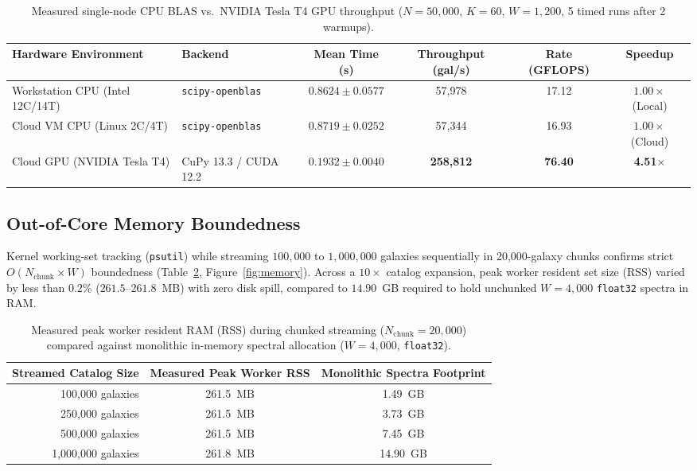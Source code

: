 \documentclass[preprint,12pt,authoryear]{elsarticle}
\begin{document}
\begin{table}[t]
\centering
\caption{Measured single-node CPU BLAS vs.\ NVIDIA Tesla T4 GPU throughput ($N=50{,}000$, $K=60$, $W=1{,}200$, 5 timed runs after 2 warmups).}
\label{tab:throughput}
\small
\begin{tabular}{@{}llcccc@{}}
\toprule
\textbf{Hardware Environment} & \textbf{Backend} & \textbf{Mean Time (s)} & \textbf{Throughput (gal/s)} & \textbf{Rate (GFLOPS)} & \textbf{Speedup} \\
\midrule
Workstation CPU (Intel 12C/14T) & \texttt{scipy-openblas} & $0.8624 \pm 0.0577$ & 57,978 & 17.12 & $1.00\times$ (Local) \\
Cloud VM CPU (Linux 2C/4T) & \texttt{scipy-openblas} & $0.8719 \pm 0.0252$ & 57,344 & 16.93 & $1.00\times$ (Cloud) \\
Cloud GPU (NVIDIA Tesla T4) & CuPy 13.3 / CUDA 12.2 & $0.1932 \pm 0.0040$ & \textbf{258,812} & \textbf{76.40} & \textbf{4.51$\times$} \\
\bottomrule
\end{tabular}
\end{table}

\subsection{Out-of-Core Memory Boundedness}
\label{sec:memory}
Kernel working-set tracking (\texttt{psutil}) while streaming $100{,}000$ to $1{,}000{,}000$ galaxies sequentially in 20,000-galaxy chunks confirms strict $O(N_{\text{chunk}} \times W)$ boundedness (Table~\ref{tab:memory}, Figure~\ref{fig:memory}). Across a $10\times$ catalog expansion, peak worker resident set size (RSS) varied by less than $0.2\%$ ($261.5$--$261.8$~MB) with zero disk spill, compared to $14.90$~GB required to hold unchunked $W=4{,}000$ \texttt{float32} spectra in RAM.

\begin{table}[t]
\centering
\caption{Measured peak worker resident RAM (RSS) during chunked streaming ($N_{\text{chunk}} = 20{,}000$) compared against monolithic in-memory spectral allocation ($W=4{,}000$, \texttt{float32}).}
\label{tab:memory}
\small
\begin{tabular}{@{}rcc@{}}
\toprule
\textbf{Streamed Catalog Size} & \textbf{Measured Peak Worker RSS} & \textbf{Monolithic Spectra Footprint} \\
\midrule
100,000 galaxies & 261.5~MB & 1.49~GB \\
250,000 galaxies & 261.5~MB & 3.73~GB \\
500,000 galaxies & 261.5~MB & 7.45~GB \\
1,000,000 galaxies & 261.8~MB & 14.90~GB \\
\bottomrule
\end{tabular}
\end{table}
\end{document}
